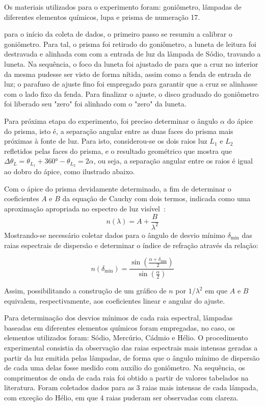 Os materiais utilizados para o experimento foram: goniômetro, lâmpadas de diferentes elementos químicos, lupa e prisma de numeração 17.

para  o início da coleta de dados, o primeiro passo se resumiu a calibrar o goniômetro. Para tal, o prisma foi retirado do goniômetro, a luneta de leitura foi destravada e alinhada com com a entrada de luz da lâmpada de Sódio, travando a luneta. Na sequência, o foco da luneta foi ajustado de para que a cruz no interior da mesma pudesse ser visto de forma nítida, assim como a fenda de entrada de luz; o parafuso de ajuste fino foi empregado para garantir que a cruz se alinhasse com o lado fixo da fenda. Para finalizar o ajuste, o disco graduado do goniômetro foi liberado seu "zero" foi alinhado com o "zero" da luneta.

Para próxima etapa do experimento, foi preciso determinar o ângulo $\alpha$ do ápice do prisma, isto é, a separação angular entre as duas faces do prisma mais próximas à fonte de luz. Para isto, considerou-se os dois raios luz $L_1$ e $L_2$ refletidos pelas faces do prisma, e o resultado geométrico que mostra que $\Delta \theta_L = \theta_{L_1} + \ang{360} - \theta_{L_2} = 2 \alpha$, ou seja, a separação angular entre os raios é igual ao dobro do ápice, como ilustrado abaixo.



Com o ápice do prisma devidamente determinado, a fim de determinar o coeficientes $A$ e $B$ da equação de Cauchy com dois termos, indicada como uma aproximação apropriada no espectro de luz visível~\cite{ref:otica}:
\begin{equation}
    n(\lambda) = A + \frac{B}{\lambda^2}
    \label{eq:cauchy}
\end{equation}
Mostrando-se necessário coletar dados para o ângulo de desvio mínimo $\delta_\text{min}$ das raias espectrais de dispersão e determinar o índice de refração através da relação:

\begin{equation}
    n\left(\delta_\text{min}\right) = \frac{
        \sin\left(\frac{\alpha + \delta_\text{min}}{2}\right)
    }{
        \sin\left(\frac{\alpha}{2}\right)
    }
    \label{eq:n}
\end{equation}

 Assim, possibilitando a construção de um gráfico de $n$ por $1/\lambda^2$ em que $A$ e $B$ equivalem, respectivamente, aos coeficientes linear e angular do ajuste.

Para determinação dos desvios mínimos de cada raia espectral, lâmpadas baseadas em diferentes elementos químicos foram empregadas, no caso, os elementos utilizados foram: Sódio, Mercúrio, Cádmio e Hélio. O procedimento experimental consistia da observação das raias espectrais mais intensas geradas a partir da luz emitida pelas lâmpadas, de forma que o ângulo mínimo de dispersão de cada uma delas fosse medido com auxilio do goniômetro. Na sequência, os comprimentos de onda de cada raia foi obtido a partir de valores tabelados na literatura. Foram coletados dados para as 3 raias mais intensas de cada lâmpada, com exceção do Hélio, em que 4 raias puderam ser observadas com clareza.

